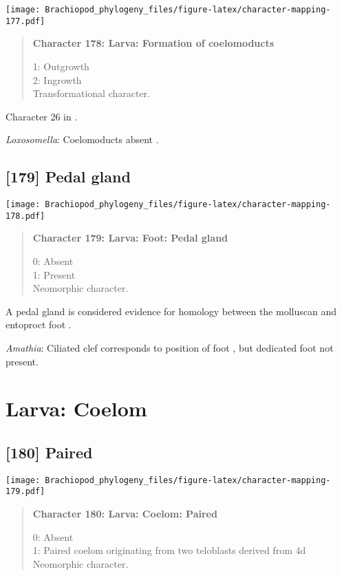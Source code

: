 \documentclass[openany]{book}
\theoremstyle{definition}
\theoremstyle{definition}
\theoremstyle{definition}
\theoremstyle{remark}
\begin{document}
\texttt{[image: Brachiopod\_phylogeny\_files/figure-latex/character-mapping-177.pdf]}

\begin{quote}
\textbf{Character 178: Larva: Formation of coelomoducts}

1: Outgrowth\\
2: Ingrowth\\
Transformational character.
\end{quote}

Character 26 in \citet{Haszprunar2000}.

\hypertarget{Loxosomella-coding-178}{}
\emph{Loxosomella}: Coelomoducts absent \citep{Haszprunar2000}.

\subsection*{{[}179{]} Pedal gland}\label{pedal-gland}

\texttt{[image: Brachiopod\_phylogeny\_files/figure-latex/character-mapping-178.pdf]}

\begin{quote}
\textbf{Character 179: Larva: Foot: Pedal gland}

0: Absent\\
1: Present\\
Neomorphic character.
\end{quote}

A pedal gland is considered evidence for homology between the molluscan
and entoproct foot \citep{Haszprunar2008}.

\hypertarget{Amathia-coding-179}{}
\emph{Amathia}: Ciliated clef corresponds to position of foot
\citep{Reed1982}, but dedicated foot not present.

\section{Larva: Coelom}\label{larva-coelom}

\subsection*{{[}180{]} Paired}\label{paired}

\texttt{[image: Brachiopod\_phylogeny\_files/figure-latex/character-mapping-179.pdf]}

\begin{quote}
\textbf{Character 180: Larva: Coelom: Paired}

0: Absent\\
1: Paired coelom originating from two teloblasts derived from 4d\\
Neomorphic character.
\end{quote}
\end{document}

